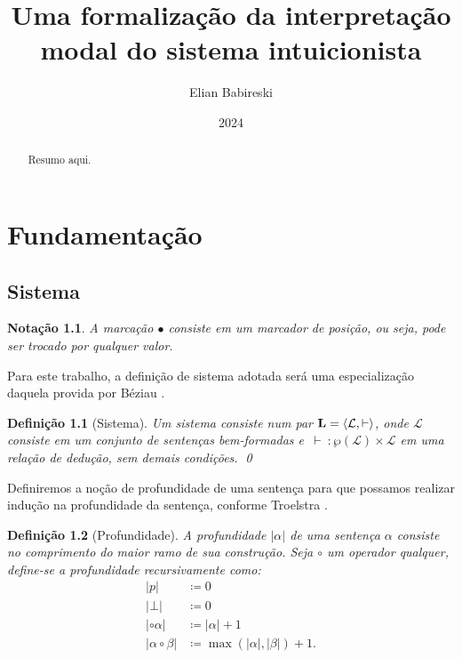 \documentclass{report}
\newtheorem{notation}{Notação}
\newtheorem{definition}{Definição}
\begin{document}
    \title{Uma formalização da interpretação modal do sistema intuicionista}
    \author{Elian Babireski}
    \date{2024}

    \maketitle

    \begin{abstract}
        Resumo aqui.
    \end{abstract}

    \tableofcontents

    
    

    \chapter{Fundamentação}

    \section{Sistema}

    \begin{notation}
        A marcação $\bullet$ consiste em um marcador de posição, ou seja, pode ser trocado por qualquer valor. 
    \end{notation}

    Para este trabalho, a definição de sistema adotada será uma especialização daquela provida por Béziau \cite{Beziau}.

    \begin{definition}[Sistema]
        Um sistema consiste num par $\mathbf{L} = \langle\mathcal{L}, \vdash\rangle$, onde $\mathcal{L}$ consiste em um conjunto de sentenças bem-formadas e $\, \vdash \: : \wp(\mathcal{L}) \times \mathcal{L} $ em uma relação de dedução, sem demais condições.
        \qed
    \end{definition}

    Definiremos a noção de profundidade de uma sentença para que possamos realizar indução na profundidade da sentença, conforme Troelstra \cite{Troelstra}.

    \begin{definition}[Profundidade]
        A profundidade $|\alpha|$ de uma sentença $\alpha$ consiste no comprimento do maior ramo de sua construção. Seja $\circ$ um operador qualquer, define-se a profundidade recursivamente como:
        \begin{align*}
            |p|                  & \coloneqq 0                           \\
            |\bot|               & \coloneqq 0                           \\
            |\circ \alpha|       & \coloneqq |\alpha| + 1                \\
            |\alpha \circ \beta| & \coloneqq \max(|\alpha|, |\beta|) + 1.
            \tag*{\qed} 
        \end{align*}
    \end{definition}
\end{document}
